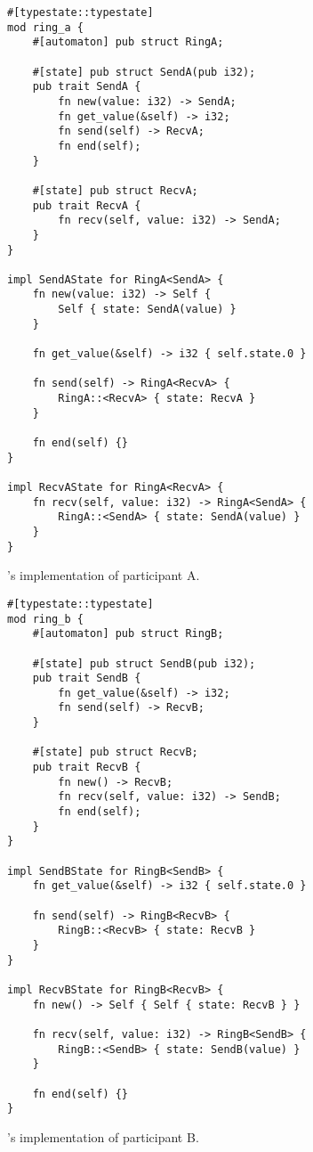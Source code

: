 \begin{listing}
    \begin{verbatim}
#[typestate::typestate]
mod ring_a {
    #[automaton] pub struct RingA;

    #[state] pub struct SendA(pub i32);
    pub trait SendA {
        fn new(value: i32) -> SendA;
        fn get_value(&self) -> i32;
        fn send(self) -> RecvA;
        fn end(self);
    }

    #[state] pub struct RecvA;
    pub trait RecvA {
        fn recv(self, value: i32) -> SendA;
    }
}

impl SendAState for RingA<SendA> {
    fn new(value: i32) -> Self {
        Self { state: SendA(value) }
    }

    fn get_value(&self) -> i32 { self.state.0 }

    fn send(self) -> RingA<RecvA> {
        RingA::<RecvA> { state: RecvA }
    }

    fn end(self) {}
}

impl RecvAState for RingA<RecvA> {
    fn recv(self, value: i32) -> RingA<SendA> {
        RingA::<SendA> { state: SendA(value) }
    }
}
    \end{verbatim}
    \caption{'s implementation of participant A.}
    \label{lst:typestate-ring-starter}
\end{listing}

\begin{listing}
    \begin{verbatim}
#[typestate::typestate]
mod ring_b {
    #[automaton] pub struct RingB;

    #[state] pub struct SendB(pub i32);
    pub trait SendB {
        fn get_value(&self) -> i32;
        fn send(self) -> RecvB;
    }

    #[state] pub struct RecvB;
    pub trait RecvB {
        fn new() -> RecvB;
        fn recv(self, value: i32) -> SendB;
        fn end(self);
    }
}

impl SendBState for RingB<SendB> {
    fn get_value(&self) -> i32 { self.state.0 }

    fn send(self) -> RingB<RecvB> {
        RingB::<RecvB> { state: RecvB }
    }
}

impl RecvBState for RingB<RecvB> {
    fn new() -> Self { Self { state: RecvB } }

    fn recv(self, value: i32) -> RingB<SendB> {
        RingB::<SendB> { state: SendB(value) }
    }

    fn end(self) {}
}
    \end{verbatim}
    \caption{'s implementation of participant B.}
    \label{lst:typestate-ring-follower}
\end{listing}


